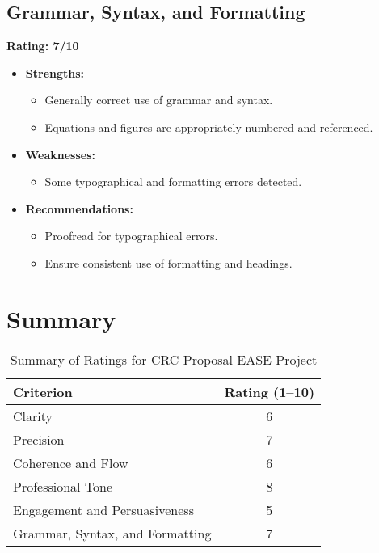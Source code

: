 \documentclass{article}
\begin{document}
\subsection{Grammar, Syntax, and Formatting}
\textbf{Rating: 7/10}

\begin{itemize}
    \item \textbf{Strengths:}
    \begin{itemize}
        \item Generally correct use of grammar and syntax.
        \item Equations and figures are appropriately numbered and referenced.
    \end{itemize}
    \item \textbf{Weaknesses:}
    \begin{itemize}
        \item Some typographical and formatting errors detected.
    \end{itemize}
    \item \textbf{Recommendations:}
    \begin{itemize}
        \item Proofread for typographical errors.
        \item Ensure consistent use of formatting and headings.
    \end{itemize}
\end{itemize}

\section{Summary}

\begin{table}[ht]
\centering
\begin{tabular}{|l|c|}
\hline
\textbf{Criterion} & \textbf{Rating (1–10)} \\ \hline
Clarity & 6 \\ \hline
Precision & 7 \\ \hline
Coherence and Flow & 6 \\ \hline
Professional Tone & 8 \\ \hline
Engagement and Persuasiveness & 5 \\ \hline
Grammar, Syntax, and Formatting & 7 \\ \hline
\end{tabular}
\caption{Summary of Ratings for CRC Proposal EASE Project}
\end{table}
\end{document}

